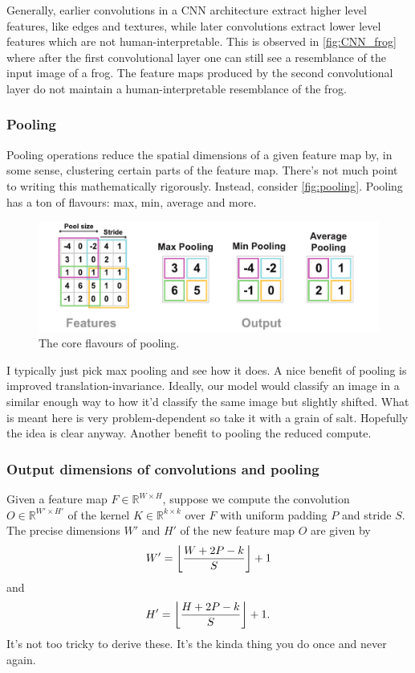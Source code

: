 \documentclass[11pt]{article}
\begin{document}
Generally, earlier convolutions in a CNN architecture extract higher level features, like edges and textures, while later convolutions extract lower level features which are not human-interpretable. This is observed in \autoref{fig:CNN_frog} where after the first convolutional layer one can still see a resemblance of the input image of a frog. The feature maps produced by the second convolutional layer do not maintain a human-interpretable resemblance of the frog.

\subsubsection{Pooling}
Pooling operations reduce the spatial dimensions of a given feature map by, in some sense, clustering certain parts of the feature map. There's not much point to writing this mathematically rigorously. Instead, consider \autoref{fig:pooling}. Pooling has a ton of flavours: max, min, average and more.

\begin{figure}[ht]
    \centering
    \includegraphics[width=1\textwidth]{./figures/neural_nets/CNN_pooling.pdf}
    \caption{The core flavours of pooling.}
    \label{fig:pooling}
\end{figure}

\noindent I typically just pick max pooling and see how it does. A nice benefit of pooling is improved translation-invariance. Ideally, our model would classify an image in a similar enough way to how it'd classify the same image but slightly shifted. What is meant here is very problem-dependent so take it with a grain of salt. Hopefully the idea is clear anyway. Another benefit to pooling the reduced compute.

\subsubsection*{Output dimensions of convolutions and pooling}
Given a feature map $F\in\mathbb{R}^{W\times H}$, suppose we compute the convolution $O\in\mathbb{R}^{W'\times H'}$ of the kernel $K\in\mathbb{R}^{k\times k}$ over $F$ with uniform padding $P$ and stride $S$. The precise dimensions $W'$ and $H'$ of the new feature map $O$ are given by
$$
W'
=
\left\lfloor
\frac{W+2P-k}{S}
\right\rfloor
+1
$$
and
$$
H'
=
\left\lfloor
\frac{H+2P-k}{S}
\right\rfloor
+1.
$$
It's not too tricky to derive these. It's the kinda thing you do once and never again.
\end{document}
